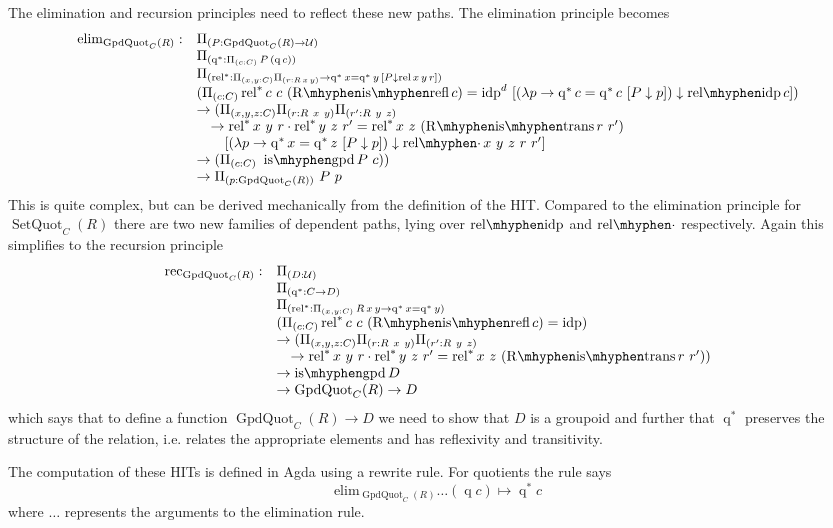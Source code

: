 \documentclass[12pt, parskip, DIV=14]{scrbook}
\newcommand{\idp}{\operatorname{idp}}
\newcommand{\isgpd}{\operatorname{is\mhyphen gpd}}
\newcommand{\q}{\operatorname{q}}
\newcommand{\rel}{\operatorname{rel}}
\newcommand{\relidp}{\operatorname{rel\mhyphen idp}}
\newcommand{\reldot}{\operatorname{rel\mhyphen \cdot}}
\newcommand{\qs}{\operatorname{q}^*}
\newcommand{\rels}{\operatorname{rel}^*}
\newcommand{\SetQuot}{\operatorname{SetQuot}_C(R)}
\newcommand{\GpdQuot}{\operatorname{GpdQuot}_C(R)}
\newcommand{\Rrefl}{\operatorname{R\mhyphen is\mhyphen refl}}
\newcommand{\Rtrans}{\operatorname{R\mhyphen is\mhyphen trans}}
\begin{document}
The elimination and recursion principles need to reflect these new paths. The elimination principle becomes
$$
\begin{array}{rl}
  \mathrm{elim}_{\GpdQuot} :& \Pi_{(P : \GpdQuot \to \mathcal{U})} \\
  &\Pi_{(\qs : \Pi_{(c : C)}\,P\,(\q c))} \\
  &\Pi_{(\rels : \Pi_{(x , y : C)}\Pi_{(r : R\,x\,y)} \to \qs x = \qs y\,[P \downarrow \rel x\,y\,r])} \\
  & (\Pi_{(c : C)} \rels c~c~(\Rrefl c) = \idp^d~[ (\lambda p \to \qs c = \qs c~[P \downarrow p]) \downarrow \relidp c]) \\
  &\to (\Pi_{(x, y, z : C)}\Pi_{(r : R~x~y)}\Pi_{(r' : R~y~z)} \\
  & \quad\to \rels x~y~r \cdot \rels y~z~r' = \rels x~z~(\Rtrans r~r') \\
  & \quad\quad[(\lambda p \to \qs x = \qs z~[P \downarrow p]) \downarrow \reldot x~y~z~r~r'] \\
  &\to (\Pi_{(c : C)}~\isgpd P~c)) \\
  &\to \Pi_{(p : \GpdQuot)}~P~p
\end{array}
$$
This is quite complex, but can be derived mechanically from the definition of the HIT. Compared to the elimination principle for $\SetQuot$ there are two new families of dependent paths, lying over $\relidp$ and $\reldot$ respectively. Again this simplifies to the recursion principle
$$
\begin{array}{rl}
  \mathrm{rec}_{\GpdQuot} :& \Pi_{(D : \mathcal{U})} \\
  &\Pi_{(\qs : C \to D)} \\
  &\Pi_{(\rels : \Pi_{(x , y : C)}\,R\,x\,y \to \qs x = \qs y)} \\
  & (\Pi_{(c : C)} \rels c~c~(\Rrefl c) = \idp) \\
  &\to (\Pi_{(x, y, z : C)}\Pi_{(r : R~x~y)}\Pi_{(r' : R~y~z)} \\
  & \quad\to \rels x~y~r \cdot \rels y~z~r' = \rels x~z~(\Rtrans r~r')) \\
  &\to \isgpd D \\
  &\to \GpdQuot \to D
\end{array}
$$
which says that to define a function $\GpdQuot \to D$ we need to show that $D$ is a groupoid and further that $\qs$ preserves the structure of the relation, i.e. relates the appropriate elements and has reflexivity and transitivity.

The computation of these HITs is defined in Agda using a rewrite rule. For quotients the rule says
$$\mathrm{elim}_{\GpdQuot} \dots (\q c) \mapsto \qs c$$
where $\dots$ represents the arguments to the elimination rule.
\end{document}
